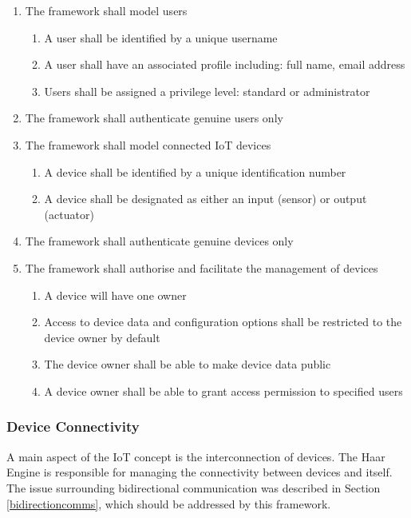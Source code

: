         \begin{enumerate}
          \item The framework shall model users
          \begin{enumerate}
            \item A user shall be identified by a unique username
            \item A user shall have an associated profile including: full name, email address
            \item Users shall be assigned a privilege level: standard or administrator
          \end{enumerate}
          \item The framework shall authenticate genuine users only

          \item The framework shall model connected IoT devices
          \begin{enumerate}
            \item A device shall be identified by a unique identification number
            \item A device shall be designated as either an input (sensor) or output (actuator)
          \end{enumerate}
          \item The framework shall authenticate genuine devices only

          \item The framework shall authorise and facilitate the management of devices
          \begin{enumerate}
            \item A device will have one owner
            \item Access to device data and configuration options shall be restricted to the device owner by default
            \item The device owner shall be able to make device data public
            \item A device owner shall be able to grant access permission to specified users
          \end{enumerate}
        \end{enumerate}

      \subsubsection{Device Connectivity}
        A main aspect of the IoT concept is the interconnection of devices. The Haar Engine is responsible for managing the connectivity between devices and itself. The issue surrounding bidirectional communication was described in Section \ref{bidirectioncomms}, which should be addressed by this framework.

